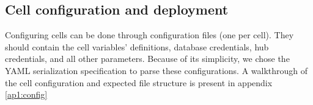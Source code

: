 \subsection{Cell configuration and deployment}

Configuring cells can be done through configuration files (one per cell). They should contain the cell variables' definitions, database credentials, hub credentials, and all other parameters. Because of its simplicity, we chose the YAML serialization specification \cite{yaml} to parse these configurations. A walkthrough of the cell configuration and expected file structure is present in appendix \ref{ap1:config}


